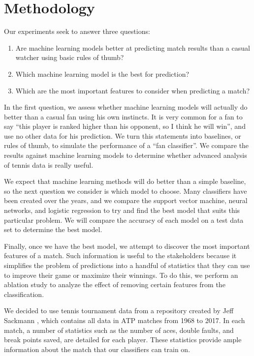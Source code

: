 \documentclass[conference]{IEEEtran}
\begin{document}
\section{Methodology}
	Our experiments seek to answer three questions:

		\begin{enumerate}
			\item Are machine learning models better at predicting match results than a casual watcher using basic rules of thumb?
			\item Which machine learning model is the best for prediction?
			\item Which are the most important features to consider when predicting a match?
		\end{enumerate}

	In the first question, we assess whether machine learning models will actually do better than a casual fan using his own instincts. It is very common for a fan to say ``this player is ranked higher than his opponent, so I think he will win'', and use no other data for his prediction. We turn this statements into baselines, or rules of thumb, to simulate the performance of a ``fan classifier''. We compare the results against machine learning models to determine whether advanced analysis of tennis data is really useful.

	We expect that machine learning methods will do better than a simple baseline, so the next question we consider is which model to choose. Many classifiers have been created over the years, and we compare the support vector machine, neural networks, and logistic regression to try and find the best model that suits this particular problem. We will compare the accuracy of each model on a test data set to determine the best model.

	Finally, once we have the best model, we attempt to discover the most important features of a match. Such information is useful to the stakeholders because it simplifies the problem of predictions into a handful of statistics that they can use to improve their game or maximize their winnings. To do this, we perform an ablation study to analyze the effect of removing certain features from the classification.

	We decided to use tennis tournament data from a repository created by Jeff Sackmann \cite{sackmann}, which contains all data in ATP matches from 1968 to 2017. In each match, a number of statistics such as the number of aces, double faults, and break points saved, are detailed for each player. These statistics provide ample information about the match that our classifiers can train on. 
\end{document}
